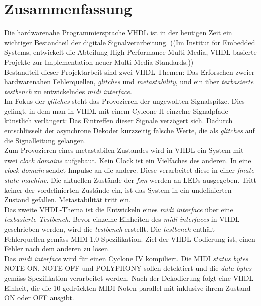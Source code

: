 
\chapter*{Zusammenfassung}

Die hardwarenahe Programmiersprache VHDL ist in der heutigen Zeit ein wichtiger Bestandteil der digitale Signalverarbeitung. ((Im Institut for Embedded Systems, entwickelt die Abteilung High Performance Multi Media, VHDL-basierte Projekte zur Implementation neuer Multi Media Standards.))\\

Bestandteil dieser Projektarbeit sind zwei VHDL-Themen: Das Erforschen zweier hardwarenahen Fehlerquellen, \textit{glitches} und \textit{metastability}, und ein über \textit{texbasierte testbench} zu entwickelndes \textit{midi interface}.\\

Im Fokus der \textit{glitches} steht das Provozieren der ungewollten Signalspitze. Dies gelingt, in dem man in VHDL mit einem Cylcone II einzelne Signalpfade künstlich verlängert: Das Eintreffen dieser Signale verzögert sich. Dadurch entschlüsselt der asynchrone Dekoder kurzzeitig falsche Werte, die als \textit{glitches} auf die Signalleitung gelangen.\\

Zum Provozieren eines metastabilen Zustandes wird in VHDL ein System mit zwei \textit{clock domains} aufgebaut. Kein Clock ist ein Vielfaches des anderen. In eine \textit{clock domain} sendet Impulse an die andere. Diese verarbeitet diese in einer \textit{finate state machine}. Die aktuellen Zustände der \textit{fsm} werden an LEDs ausgegeben. Tritt keiner der vordefinierten Zustände ein, ist das System in ein undefinierten Zustand gefallen. Metastabilität tritt ein.\\

Das zweite VHDL-Thema ist die Entwickeln eines \textit{midi interface} über eine \textit{texbasierte Testbench}. Bevor einzelne Einheiten des \textit{midi interfaces} in VHDL geschrieben werden, wird die \textit{testbench} erstellt. Die \textit{testbench} enthält Fehlerquellen gemäss MIDI 1.0 Spezifikation. Ziel der VHDL-Codierung ist, einen Fehler nach dem anderen zu lösen. \\

Das \textit{midi interface} wird für einen Cyclone IV kompiliert. Die MIDI \textit{status bytes} NOTE ON, NOTE OFF und POLYPHONY sollen detektiert und die \textit{data bytes} gemäss Spezifikation verarbeitet werden. Nach der Dekodierung folgt eine VHDL-Einheit, die die 10 gedrückten MIDI-Noten parallel mit inklusive ihrem Zustand ON oder OFF ausgibt. 





